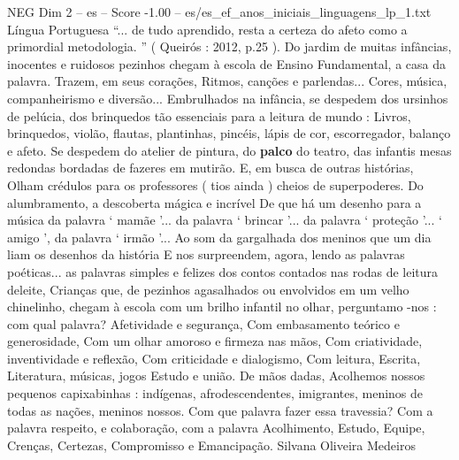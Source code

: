 \begin{textsample}{NEG Dim 2 – es – Score -1.00 – es/es\_ef\_anos\_iniciais\_linguagens\_lp\_1.txt}  \label{ex:f2_neg_075}
Língua Portuguesa “... de tudo aprendido, resta a certeza do afeto como a primordial metodologia. ” ( Queirós : 2012, p.25 ).
Do jardim de muitas infâncias, inocentes e ruidosos pezinhos chegam à escola de Ensino Fundamental, a casa da palavra.
Trazem, em seus corações, Ritmos, canções e parlendas...
Cores, música, companheirismo e diversão...
Embrulhados na infância, se despedem dos ursinhos de pelúcia, dos brinquedos tão essenciais para a leitura de mundo : Livros, brinquedos, violão, flautas, plantinhas, pincéis, lápis de cor, escorregador, balanço e afeto.
Se despedem do atelier de pintura, do \textbf{palco} do teatro, das infantis mesas redondas bordadas de fazeres em mutirão.
E, em busca de outras histórias, Olham crédulos para os professores ( tios ainda ) cheios de superpoderes.
Do alumbramento, a descoberta mágica e incrível De que há um desenho para a música da palavra ‘ mamãe ’... da palavra ‘ brincar ’... da palavra ‘ proteção ’... ‘ amigo ’, da palavra ‘ irmão ’...
Ao som da gargalhada dos meninos que um dia liam os desenhos da história E nos surpreendem, agora, lendo as palavras poéticas... as palavras simples e felizes dos contos contados nas rodas de leitura deleite, Crianças que, de pezinhos agasalhados ou envolvidos em um velho chinelinho, chegam à escola com um brilho infantil no olhar, perguntamo -nos : com qual palavra?
Afetividade e segurança, Com embasamento teórico e generosidade, Com um olhar amoroso e firmeza nas mãos, Com criatividade, inventividade e reflexão, Com criticidade e dialogismo, Com leitura, Escrita, Literatura, músicas, jogos Estudo e união.
De mãos dadas, Acolhemos nossos pequenos capixabinhas : indígenas, afrodescendentes, imigrantes, meninos de todas as nações, meninos nossos.
Com que palavra fazer essa travessia?
Com a palavra respeito, e colaboração, com a palavra Acolhimento, Estudo, Equipe, Crenças, Certezas, Compromisso e Emancipação.
Silvana Oliveira Medeiros

\end{textsample}
